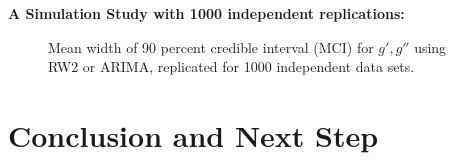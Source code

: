 \documentclass{beamer} %
\begin{document}
\begin{frame}
\textbf{A Simulation Study with 1000 independent replications:}

\begin{figure}[p]
    \centering
    \caption{Mean width of 90 percent credible interval (MCI) for $g',g''$ using RW2 or ARIMA, replicated for 1000 independent data sets.}
    \label{fig:sim1-1000replic}
\end{figure}
\end{frame}




\section{Conclusion and Next Step}
\end{document}
